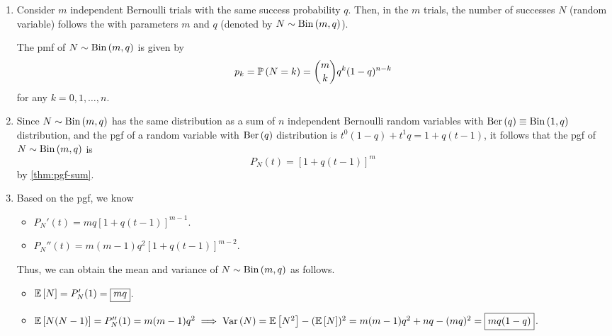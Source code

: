 \begin{enumerate}
\item Consider \(m\) independent Bernoulli trials with the same success
probability \(q\). Then, in the \(m\) trials, the number of successes \(N\)
(random variable) follows the  with parameters
\(m\) and \(q\) (denoted by \(N\sim\operatorname{Bin}\left(m,q\right)\)).

The pmf of \(N\sim\operatorname{Bin}\left(m,q\right)\) is given by
\[
p_k=\mathbb{P}\left(N=k\right)=\binom{m}{k}q^k(1-q)^{n-k}
\]
for any \(k=0,1,\dotsc,n\).

\item \label{it:bin-pgf}
Since \(N\sim\operatorname{Bin}\left(m,q\right)\) has the same distribution as a sum of \(n\)
independent Bernoulli random variables with \(\operatorname{Ber}\left(q\right)\equiv\operatorname{Bin}\left(1,q\right)\) distribution, and the
pgf of a random variable with \(\operatorname{Ber}\left(q\right)\) distribution is
\(t^0(1-q)+t^1q=1+q(t-1)\), it follows that the pgf of \(N\sim\operatorname{Bin}\left(m,q\right)\) is
\[
P_N(t)=\boxed{[1+q(t-1)]^m}
\]
by \cref{thm:pgf-sum}.

\item \label{it:bin-mean-var}
Based on the pgf, we know
\begin{itemize}
\item \(P_N'(t)=mq[1+q(t-1)]^{m-1}\).
\item \(P_N''(t)=m(m-1)q^2[1+q(t-1)]^{m-2}\).
\end{itemize}

Thus, we can obtain the mean and variance of \(N\sim\operatorname{Bin}\left(m,q\right)\) as follows.
\begin{itemize}
\item \(\mathbb{E}\left[N\right]=P_N'(1)=\boxed{mq}\).
\item \(\mathbb{E}\left[N(N-1)\right]=P_N''(1)=m(m-1)q^2\implies
\operatorname{Var}\left(N\right)=\mathbb{E}\left[N^2\right]-(\mathbb{E}\left[N\right])^2
=m(m-1)q^2+nq-(mq)^2
=\boxed{mq(1-q)}\).
\end{itemize}
\end{enumerate}
